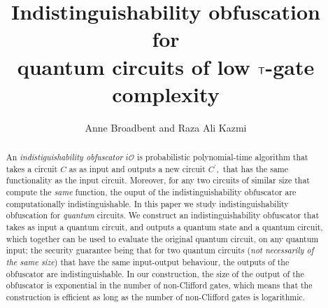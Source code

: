 \documentclass[english,11pt]{article}
\title{Indistinguishability obfuscation \\for\\ quantum circuits of low ${\sf T}$-gate complexity}
\author{Anne Broadbent and Raza Ali Kazmi}
\affil{University of Ottawa, Department of Mathematics and Statistics,\\\texttt{\{abroadbe,rkazmi\}@uottawa.ca.}}
\date{} %
\begin{document}
\maketitle

\begin{abstract}
An \emph{indistiguishability obfuscator} $i\mathcal{O}$ is probabilistic polynomial-time algorithm that takes a circuit $C$ as as input%
and outputs a new circuit $C^\prime,$ that has the same functionality as the input circuit. Moreover, for any two circuits of similar size that compute the \emph{same} function, the ouput of the indistinguishability obfuscator are computationally indistinguishable. In this paper we study indistinguishability obfuscation for \emph{quantum} circuits. We construct an indistinguishability  obfuscator that takes as input a quantum circuit, and outputs a quantum state and a quantum circuit, which together can be used to evaluate the original quantum circuit, on any quantum input; the security guarantee being that for two quantum circuits ({\em not necessarily of the same size}) that have the same input-output behaviour, the outputs of the obfuscator are indistinguishable. In our construction, the size of the output of the obfuscator is exponential in the number of non-Clifford gates, which means that the construction is efficient as long as the number of non-Clifford gates is logarithmic. 
\end{abstract}

\newpage

\setcounter{tocdepth}{2}
\tableofcontents
\clearpage
{}
\setcounter{page}{1}







%



%
\end{document}
